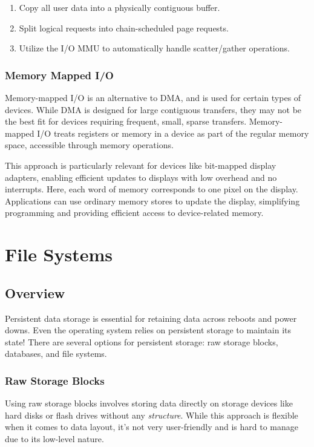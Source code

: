 \documentclass{report}
\newcommand{\exampleBegin}[1]{\begin{tcolorbox}[colback=blue!5!white,colframe=black!75!blue,title={Example:
      #1}]}
\newcommand{\exampleEnd}{\end{tcolorbox}}
\begin{document}
\begin{enumerate}[label=\textit{(\roman*)}]
\item Copy all user data into a physically contiguous buffer.
\item Split logical requests into chain-scheduled page requests.
\item Utilize the I/O MMU to automatically handle scatter/gather operations.
\end{enumerate}

\subsection{Memory Mapped I/O}
Memory-mapped I/O is an alternative to DMA, and is used for certain types of devices. While DMA is
designed for large contiguous transfers, they may not be the best fit for devices requiring
frequent, small, sparse transfers. Memory-mapped I/O treats registers or memory in a device as part
of the regular memory space, accessible through memory operations.

\exampleBegin{Display Adapters}
This approach is particularly relevant for devices like bit-mapped display adapters, enabling
efficient updates to displays with low overhead and no interrupts. Here, each word of memory
corresponds to one pixel on the display. Applications can use ordinary memory stores to update the
display, simplifying programming and providing efficient access to device-related memory.
\exampleEnd










\chapter{File Systems}
\section{Overview}
Persistent data storage is essential for retaining data across reboots and power downs. Even the
operating system relies on persistent storage to maintain its state! There are several options for
persistent storage: raw storage blocks, databases, and file systems.

\subsection*{Raw Storage Blocks}
Using raw storage blocks involves storing data directly on storage devices like hard disks or flash
drives without any \textit{structure}. While this approach is flexible when it comes to data layout,
it's not very user-friendly and is hard to manage due to its low-level nature.
\end{document}
